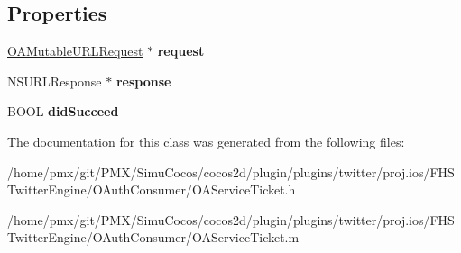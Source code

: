 \subsection*{Properties}
\begin{DoxyCompactItemize}
\item 
\mbox{\label{interfaceOAServiceTicket_a6f91f5655ff0fa996f057e1a4c7b06da}} 
\hyperlink{interfaceOAMutableURLRequest}{O\+A\+Mutable\+U\+R\+L\+Request} $\ast$ {\bfseries request}
\item 
\mbox{\label{interfaceOAServiceTicket_a61c031b1bb952f576fd7f5b4e2b12ddb}} 
N\+S\+U\+R\+L\+Response $\ast$ {\bfseries response}
\item 
\mbox{\label{interfaceOAServiceTicket_a6a025926126aff333006926c7538d1d8}} 
B\+O\+OL {\bfseries did\+Succeed}
\end{DoxyCompactItemize}


The documentation for this class was generated from the following files\+:\begin{DoxyCompactItemize}
\item 
/home/pmx/git/\+P\+M\+X/\+Simu\+Cocos/cocos2d/plugin/plugins/twitter/proj.\+ios/\+F\+H\+S\+Twitter\+Engine/\+O\+Auth\+Consumer/O\+A\+Service\+Ticket.\+h\item 
/home/pmx/git/\+P\+M\+X/\+Simu\+Cocos/cocos2d/plugin/plugins/twitter/proj.\+ios/\+F\+H\+S\+Twitter\+Engine/\+O\+Auth\+Consumer/O\+A\+Service\+Ticket.\+m\end{DoxyCompactItemize}
